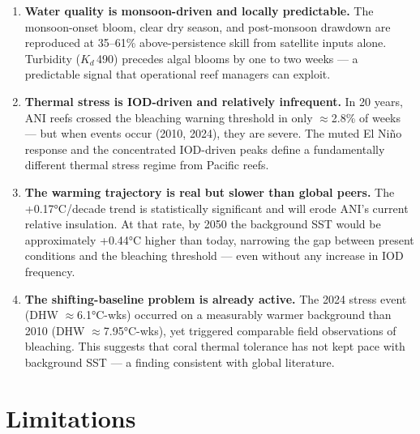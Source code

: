 \documentclass[12pt,a4paper]{report}
\begin{document}
\begin{enumerate}
  \item \textbf{Water quality is monsoon-driven and locally predictable.}
  The monsoon-onset bloom, clear dry season, and post-monsoon drawdown are
  reproduced at 35--61\% above-persistence skill from satellite inputs alone.
  Turbidity ($K_d$\,490) precedes algal blooms by one to two weeks — a predictable
  signal that operational reef managers can exploit.

  \item \textbf{Thermal stress is IOD-driven and relatively infrequent.}
  In 20 years, ANI reefs crossed the bleaching warning threshold in only $\approx$2.8\%
  of weeks — but when events occur (2010, 2024), they are severe. The muted El Niño
  response and the concentrated IOD-driven peaks define a fundamentally different
  thermal stress regime from Pacific reefs.

  \item \textbf{The warming trajectory is real but slower than global peers.}
  The +0.17°C/decade trend is statistically significant and will erode ANI's current
  relative insulation. At that rate, by 2050 the background SST would be approximately
  +0.44°C higher than today, narrowing the gap between present conditions and the
  bleaching threshold — even without any increase in IOD frequency.

  \item \textbf{The shifting-baseline problem is already active.}
  The 2024 stress event (DHW $\approx$6.1°C-wks) occurred on a measurably warmer
  background than 2010 (DHW $\approx$7.95°C-wks), yet triggered comparable field
  observations of bleaching. This suggests that coral thermal tolerance has not
  kept pace with background SST — a finding consistent with global literature.
\end{enumerate}

\section{Limitations}
\end{document}
